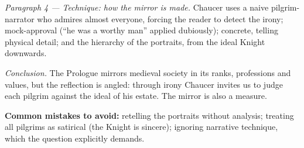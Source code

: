 \documentclass[11pt]{article}
\begin{document}
\begin{corrige}
\emph{Paragraph 4 — Technique: how the mirror is made.} Chaucer uses a naive pilgrim-narrator who admires almost everyone, forcing the reader to detect the irony; mock-approval (``he was a worthy man'' applied dubiously); concrete, telling physical detail; and the hierarchy of the portraits, from the ideal Knight downwards.

\emph{Conclusion.} The Prologue mirrors medieval society in its ranks, professions and values, but the reflection is angled: through irony Chaucer invites us to judge each pilgrim against the ideal of his estate. The mirror is also a measure.

\textbf{Common mistakes to avoid:} retelling the portraits without analysis; treating all pilgrims as satirical (the Knight is sincere); ignoring narrative technique, which the question explicitly demands.
\end{corrige}
\end{document}
